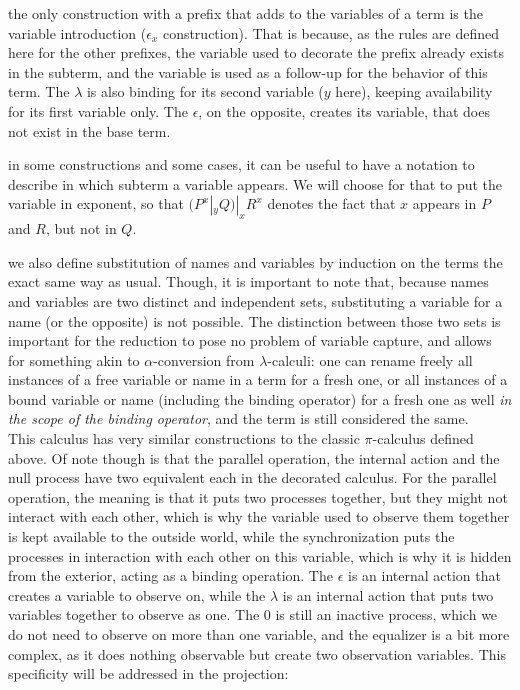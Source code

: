 \remark the only construction with a prefix that adds to the variables of a term is the variable introduction ($\epsilon_x$ construction). That is because, as the rules are defined here for the other prefixes, the variable used to decorate the prefix already exists in the subterm, and the variable is used as a follow-up for the behavior of this term. The $\lambda$ is also binding for its second variable ($y$ here), keeping availability for its first variable only. The $\epsilon$, on the opposite, creates its variable, that does not exist in the base term.

\remark in some constructions and some cases, it can be useful to have a notation to describe in which subterm a variable appears. We will choose for that to put the variable in exponent, so that $(P^x |_y Q) |_x R^x$ denotes the fact that $x$ appears in $P$ and $R$, but not in $Q$.

\remark we also define substitution of names and variables by induction on the terms the exact same way as usual. Though, it is important to note that, because names and variables are two distinct and independent sets, substituting a variable for a name (or the opposite) is not possible. The distinction between those two sets is important for the reduction to pose no problem of variable capture, and allows for something akin to $\alpha$-conversion from $\lambda$-calculi: one can rename freely all instances of a free variable or name in a term for a fresh one, or all instances of a bound variable or name (including the binding operator) for a fresh one as well \emph{in the scope of the binding operator}, and the term is still considered the same.\\

This calculus has very similar constructions to the classic $\pi$-calculus defined above. Of note though is that the parallel operation, the internal action and the null process have two equivalent each in the decorated calculus. For the parallel operation, the meaning is that it puts two processes together, but they might not interact with each other, which is why the variable used to observe them together is kept available to the outside world, while the synchronization puts the processes in interaction with each other on this variable, which is why it is hidden from the exterior, acting as a binding operation. The $\epsilon$ is an internal action that creates a variable to observe on, while the $\lambda$ is an internal action that puts two variables together to observe as one. The $0$ is still an inactive process, which we do not need to observe on more than one variable, and the equalizer is a bit more complex, as it does nothing observable but create two observation variables. This specificity will be addressed in the projection:

